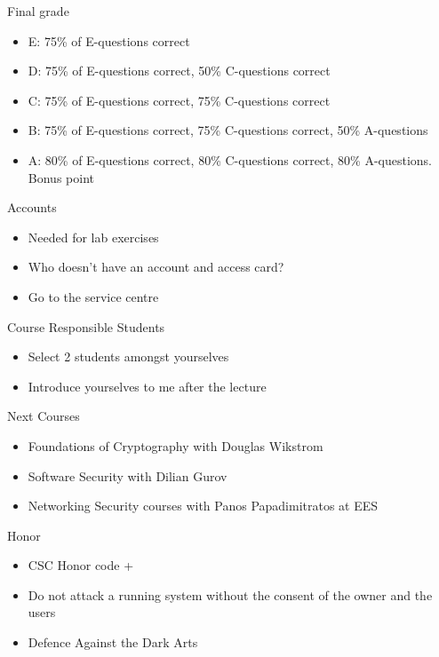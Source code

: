 \documentclass{beamer}
\begin{document}
\begin{frame}{Final grade}
  \begin{itemize}
  \item E: 75\% of E-questions correct
  \item D: 75\% of E-questions correct, 50\% C-questions correct
  \item C: 75\% of E-questions correct, 75\% C-questions correct
  \item B: 75\% of E-questions correct, 75\% C-questions correct, 50\%
    A-questions
  \item A: 80\% of E-questions correct, 80\% C-questions correct, 80\%
    A-questions. Bonus point
  \end{itemize}
\end{frame}

\begin{frame}{Accounts}
  \begin{itemize}
  \item Needed for lab exercises
  \item Who doesn't have an account and access card?
  \item Go to the service centre
  \end{itemize}
\end{frame}

\begin{frame}{Course Responsible Students }
  \begin{itemize}
  \item Select 2 students amongst yourselves 
  \item Introduce yourselves to me after the lecture 
  \end{itemize}
\end{frame}


\begin{frame}{Next Courses}
  \begin{itemize}
  \item Foundations of Cryptography with Douglas Wikstr\:om
  \item Software Security with Dilian Gurov
  \item Networking Security courses with Panos
    Papadimitratos at EES
  \end{itemize}
\end{frame}

\begin{frame}{Honor}
  \begin{itemize}
  \item CSC Honor code +
  \item \alert{Do not attack a running system 
    without the consent of the owner 
    and the users}
  \item Defence Against the Dark Arts
  \end{itemize}
\end{frame}
\end{document}
